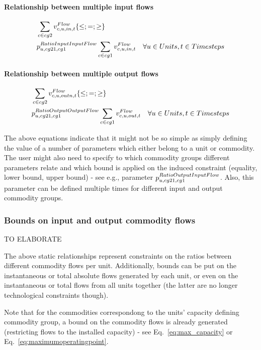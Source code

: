 \paragraph{Relationship between multiple input flows}
\begin{align} \label{eq:ratioinputinputflow}
&\sum_{\commodity \in cg2} \vFlow[\commodity,\unit,in,\timestep] \{\le;=;\ge\} \nonumber \\
&\pRatioInputInputFlow \sum_{\commodity \in cg1} \vFlow[\commodity,\unit,in,\timestep] \quad \forall \units, \timesteps
\end{align}

\paragraph{Relationship between multiple output flows}
\begin{align} \label{eq:ratiooutputoutputflow}
&\sum_{\commodity \in cg2} \vFlow[\commodity,\unit,outn,\timestep] \{\le;=;\ge\} \nonumber \\
&\pRatioOutputOutputFlow \sum_{\commodity \in cg1} \vFlow[\commodity,\unit,out,\timestep] \quad \forall \units, \timesteps
\end{align}

{\color{red}
The above equations indicate that it might not be so simple as simply defining the value of a number of parameters which either belong to a unit or commodity. The user might also need to specify to which commodity groups different parameters relate and which bound is applied on the induced constraint (equality, lower bound, upper bound) - see e.g., parameter $\pRatioOutputInputFlow$. Also, this parameter can be defined multiple times for different input and output commodity groups. 
}

\subsubsection{Bounds on input and output commodity flows}
{\color{red} TO ELABORATE}

The above static relationships represent constraints on the ratios between different commodity flows per unit. Additionally, bounds can be put on the instantaneous or total absolute flows generated by each unit, or even on the instantaneous or total flows from all units together (the latter are no longer technological constraints though).

Note that for the commodities correspondong to the units' capacity defining commodity group, a bound on the commodity flows is already generated (restricting flows to the installed capacity) - see Eq.~\eqref{eq:max_capacity} or Eq.~\eqref{eq:maximumoperatingpoint}.




